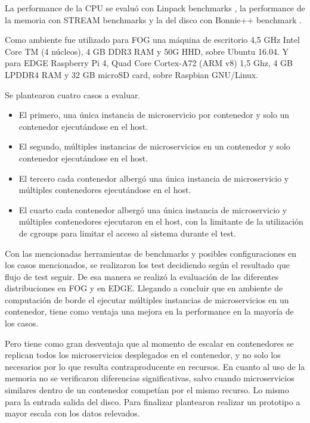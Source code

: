 La performance de la CPU se evaluó con Linpack benchmarks 
\cite{LINPACKBenchmarksWikipedia}, la performance de la memoria con STREAM benchmarks 
\cite{STREAMBenchmarkAMD} 
y la del disco con Bonnie++ benchmark \cite{BonnieWikipedia}.

Como ambiente fue utilizado para FOG una máquina de escritorio 4,5 GHz Intel Core TM (4 núcleos),
4 GB DDR3 RAM y 50G HHD, sobre Ubuntu 16.04. Y para EDGE Raspberry Pi 4, Quad Core Cortex-A72 (ARM v8) 1,5 Ghz,
4 GB LPDDR4 RAM y 32 GB microSD card, sobre Raspbian GNU/Linux. 

 Se plantearon cuatro casos a evaluar.
 \begin{itemize}
     \item El primero, una única instancia de microservicio por contenedor y solo un contenedor ejecutándose en el host.
     \item El segundo, múltiples instancias de microservicios en un contenedor y solo contenedor ejecutándose en el host. 
     \item El tercero cada contenedor albergó una única instancia de microservicio y múltiples contenedores ejecutándose en el host.
     \item El cuarto cada contenedor albergó una única instancia de microservicio y múltiples contenedores ejecutaron en el host, 
     con la limitante de la utilización de cgroups para limitar el acceso al sistema durante el test.
 \end{itemize}
 
 Con las mencionadas herramientas de benchmarks y posibles configuraciones en los casos mencionados,
 se realizaron los test decidiendo según el resultado que flujo de test seguir.
 De esa manera se realizó la evaluación de las diferentes distribuciones en FOG y en EDGE. 
 Llegando a concluir que en ambiente de computación de borde el ejecutar múltiples instancias de microservicios en un contenedor,
 tiene como ventaja una mejora en la performance en la mayoría de los casos.

 Pero tiene como gran desventaja que al momento de escalar en contenedores se replican todos los microservicios desplegados en el contenedor, 
 y no solo los necesarios por lo que resulta contraproducente en recursos. 
 En cuanto al uso de la memoria no se verificaron diferencias significativas, 
 salvo cuando microservicios similares dentro de un contenedor competían por el mismo recurso. 
 Lo mismo para la entrada salida del disco. Para finalizar plantearon realizar un prototipo a mayor escala con los datos relevados.
